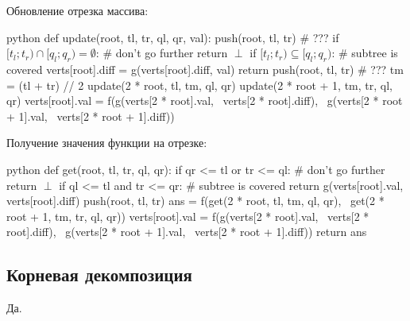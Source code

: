 {\bold Обновление} отрезка массива:
\begin{code}{python}
def update(root, tl, tr, ql, qr, val):
  push(root, tl, tr) # ???
  if $[t_l;t_r)\cap[q_l;q_r)=\emptyset$: # don't go further
    return $\perp$
  if $[t_l;t_r)\subseteq[q_l;q_r)$: # subtree is covered
    verts[root].diff = g(verts[root].diff, val)
    return
  push(root, tl, tr) # ???
  tm = (tl + tr) // 2
  update(2 * root, tl, tm, ql, qr)
  update(2 * root + 1, tm, tr, ql, qr)
  verts[root].val = f(g(verts[2 * root].val, \
                        verts[2 * root].diff), \
                      g(verts[2 * root + 1].val, \
                        verts[2 * root + 1].diff))
\end{code}

{\bold Получение} значения функции на отрезке:
\begin{code}{python}
def get(root, tl, tr, ql, qr):
  if qr <= tl or tr <= ql: # don't go further
    return $\perp$
  if ql <= tl and tr <= qr: # subtree is covered
    return g(verts[root].val, verts[root].diff)
  push(root, tl, tr)
  ans = f(get(2 * root, tl, tm, ql, qr), \
          get(2 * root + 1, tm, tr, ql, qr))
  verts[root].val = f(g(verts[2 * root].val, \
                        verts[2 * root].diff), \
                      g(verts[2 * root + 1].val, \
                        verts[2 * root + 1].diff))
  return ans
\end{code}

\subsection{Корневая декомпозиция}

Да.
